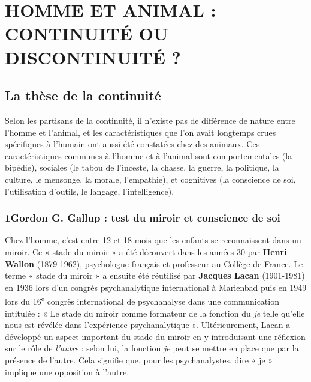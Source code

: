 \section{HOMME ET ANIMAL : CONTINUITÉ OU DISCONTINUITÉ ?}
\subsection{La thèse de la continuité}
Selon les partisans de la continuité, il n’existe pas de différence de nature entre l’homme et l’animal, et les caractéristiques que l’on avait longtemps crues spécifiques à l’humain ont aussi été constatées chez des animaux. Ces caractéristiques communes à l’homme et à l’animal sont comportementales (la bipédie), sociales (le tabou de l’inceste, la chasse, la guerre, la politique, la culture, le mensonge, la morale, l’empathie), et cognitives (la conscience de soi, l’utilisation d’outils, le langage, l’intelligence).
\subsubsection*{1\quad Gordon G. Gallup : test du miroir et conscience de soi}
Chez l’homme, c’est entre 12 et 18 mois que les enfants se reconnaissent dans un miroir. Ce « stade du miroir » a été découvert dans les années 30 par \textbf{Henri Wallon} (1879-1962), psychologue français et professeur au Collège de France. Le terme « stade du miroir » a ensuite été réutilisé par \textbf{Jacques Lacan} (1901-1981) en 1936 lors d’un congrès psychanalytique international à Marienbad puis en 1949 lors du 16\textsuperscript{e} congrès international de psychanalyse dans une communication intitulée : « Le stade du miroir comme formateur de la fonction du \textit{je} telle qu’elle nous est révélée dans l’expérience psychanalytique ». Ultérieurement, Lacan a développé un aspect important du stade du miroir en y introduisant une réflexion sur le rôle de \textit{l’autre} : selon lui, la fonction \textit{je} peut se mettre en place que par la présence de l’autre. Cela signifie que, pour les psychanalystes, dire « je » implique une opposition à l’autre.

